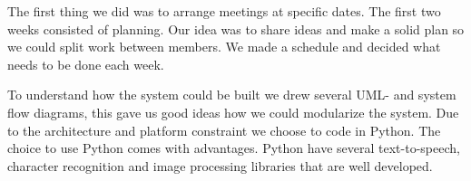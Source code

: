 \documentclass[../main.tex]{subfiles}
\begin{document}
The first thing we did was to arrange meetings at specific dates. The first
two weeks consisted of planning. Our idea was to share ideas and make a solid
plan so we could split work between members. We made a schedule and decided
what needs to be done each week. 

To understand how the system could be built we drew several UML- and system
flow diagrams, this gave us good ideas how we could modularize the system. Due
to the architecture and platform constraint we choose to code in Python. The
choice to use Python comes with advantages. Python have several 
text-to-speech, character recognition and image processing libraries that are
well developed.
\end{document}
